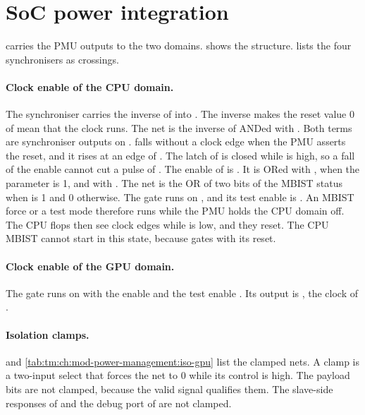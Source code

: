 \section{SoC power integration}\label{tm:ch:mod-power-management:soc}
 carries the PMU outputs to the two domains.  shows the structure.  lists the four synchronisers as crossings.

\paragraph{Clock enable of the CPU domain.} The synchroniser  carries the inverse of  into . The inverse makes the reset value 0 of  mean that the clock runs. The net  is the inverse of  ANDed with . Both terms are synchroniser outputs on .  falls without a clock edge when the PMU asserts the reset, and it rises at an edge of . The latch of  is closed while  is high, so a fall of the enable cannot cut a pulse of . The enable of  is . It is  ORed with , when the parameter  is 1, and with . The net  is the OR of two bits of the MBIST status when  is 1 and 0 otherwise. The gate runs on , and its test enable is . An MBIST force or a test mode therefore runs  while the PMU holds the CPU domain off. The CPU flops then see clock edges while  is low, and they reset. The CPU MBIST cannot start in this state, because  gates  with its reset.

\paragraph{Clock enable of the GPU domain.} The gate  runs on  with the enable  and the test enable . Its output is , the clock of .

\paragraph{Isolation clamps.}  and \cref{tab:tm:ch:mod-power-management:iso-gpu} list the clamped nets. A clamp is a two-input select that forces the net to 0 while its control is high. The payload bits are not clamped, because the valid signal qualifies them. The slave-side responses of  and the debug port of  are not clamped.

